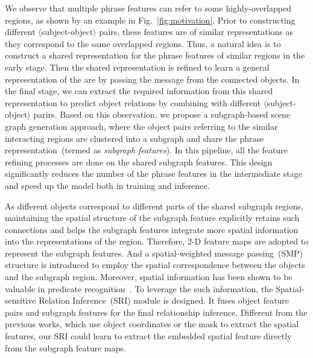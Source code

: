 \documentclass[runningheads]{llncs}
\begin{document}
 We observe that multiple phrase features can refer to some highly-overlapped regions, as shown by an example in  Fig.~\ref{fig:motivation}. Prior to constructing different $\langle$subject-object$\rangle$ pairs, these features are of similar representations as they correspond to the same overlapped regions. Thus, a natural idea is to construct a shared representation for the phrase features of similar regions in the early stage. Then the shared representation is refined to learn a general representation of the are by passing the message from the connected objects. In the final stage, we can extract the required information from this shared representation to predict object relations by combining with different $\langle$subject-object$\rangle$ parirs.  Based on this observation, we propose a subgraph-based scene graph generation approach, where the object pairs referring to the similar interacting regions are clustered into a subgraph and share the phrase representation~(termed as \emph{subgraph features}). In this pipeline, all the feature refining processes are done on the shared subgraph features. 
 This design significantly reduces the number of the phrase features in the intermediate stage and speed up the model both in training and inference. 

As different objects correspond to different parts of the shared subgraph regions, maintaining the spatial structure of the subgraph feature explicitly retains such connections and helps the subgraph features integrate more spatial information into the representations of the region. Therefore, 2-D feature maps are adopted to represent the subgraph features. And a spatial-weighted message passing~(SMP) structure is introduced to employ the spatial correspondence between the objects and the subgraph region. 
Moreover, spatial information has been shown to be valuable in predicate recognition~\cite{dai2017detecting,liao2017natural,yu2017visual}. To leverage the such information, the Spatial-sensitive Relation Inference~(SRI) module is designed. It fuses object feature pairs and subgraph features for the final relationship inference. 
Different from the previous works, which use object coordinates or the mask to extract the spatial features, our SRI could learn to extract the embedded spatial feature directly from the subgraph feature maps. 
\end{document}
